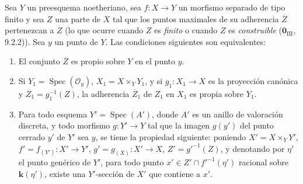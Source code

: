 \begin{corollary}[15.7.4]
\label{IV.15.7.4}
Sea $Y$ un preesquema noetheriano, sea $f:X\to Y$ un morfismo separado de tipo finito y sea $Z$ una parte de $X$ tal que los puntos maximales de su adherencia $\overline Z$ pertenezcan a $Z$ \textup{(lo que ocurre cuando $Z$ es \emph{finito} o cuando $Z$ es \emph{construible} ($\mathbf{0}_{\mathrm{III}}$, 9.2.2))}.
Sea $y$ un punto de $Y$.
Las condiciones siguientes son equivalentes:
\begin{enumerate}[label=\emph{\alph*)}]
  \item El conjunto $\overline Z$ es propio sobre $Y$ en el punto $y$.
  \item Si $Y_1=\operatorname{Spec}(\mathcal O_y)$, $X_1=X\times_Y Y_1$, y si $g_1:X_1\to X$ es la proyección canónica y $Z_1=g_1^{-1}(Z)$, la adherencia $\overline Z_1$ de $Z_1$ en $X_1$ es propia sobre $Y_1$.
  \item Para todo esquema $Y'=\operatorname{Spec}(A')$, donde $A'$ es un anillo de valoración discreta, y todo morfismo $g:Y'\to Y$ tal que la imagen $g(y')$ del punto cerrado $y'$ de $Y'$ sea $y$, se tiene la propiedad siguiente: poniendo $X'=X\times_Y Y'$, $f'=f_{(Y')}:X'\to Y'$, $g'=g_{(X)}:X'\to X$, $Z'=g'^{-1}(Z)$, y denotando por $\eta'$
el punto genérico de $Y'$, para todo punto $x'\in Z'\cap f'^{-1}(\eta')$ racional sobre $\boldsymbol{k}(\eta')$, existe una $Y'$-sección de $X'$ que contiene a $x'$.
\end{enumerate}
\end{corollary}

